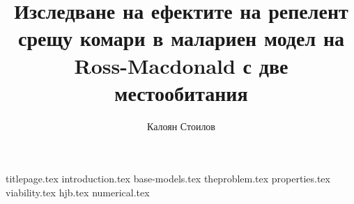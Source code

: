 \documentclass[bulgarian, 12pt]{article}
\title{Изследване на ефектите на репелент срещу комари в малариен модел на Ross-Macdonald с две местообитания}
\author{Калоян Стоилов}
\theoremstyle{definition}
\begin{document}
{titlepage.tex}
\tableofcontents
\thispagestyle{empty}
\newpage
\setcounter{page}{1}
{introduction.tex}
{base-models.tex}
{theproblem.tex}
{properties.tex}
{viability.tex}
{hjb.tex}
{numerical.tex}
\pagebreak
\printbibliography[heading=bibintoc]
% 
% 
\end{document}
